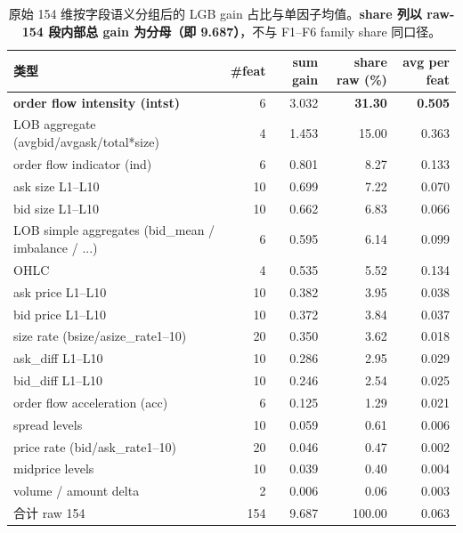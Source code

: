 \documentclass[10.5pt,a4paper]{article}
\begin{document}
\begin{table}[H]
\centering\small
\begin{tabular}{l r r r r}
\toprule
类型 & \#feat & sum gain & share raw (\%) & avg per feat \\
\midrule
\textbf{order flow intensity (intst)}     &  6 & 3.032 & \textbf{31.30} & \textbf{0.505} \\
LOB aggregate (avgbid/avgask/total*size)  &  4 & 1.453 & 15.00 & 0.363 \\
order flow indicator (ind)                &  6 & 0.801 &  8.27 & 0.133 \\
ask size L1–L10                           & 10 & 0.699 &  7.22 & 0.070 \\
bid size L1–L10                           & 10 & 0.662 &  6.83 & 0.066 \\
LOB simple aggregates (bid\_mean / imbalance / ...) &  6 & 0.595 &  6.14 & 0.099 \\
OHLC                                      &  4 & 0.535 &  5.52 & 0.134 \\
ask price L1–L10                          & 10 & 0.382 &  3.95 & 0.038 \\
bid price L1–L10                          & 10 & 0.372 &  3.84 & 0.037 \\
size rate (bsize/asize\_rate1–10)         & 20 & 0.350 &  3.62 & 0.018 \\
ask\_diff L1–L10                          & 10 & 0.286 &  2.95 & 0.029 \\
bid\_diff L1–L10                          & 10 & 0.246 &  2.54 & 0.025 \\
order flow acceleration (acc)             &  6 & 0.125 &  1.29 & 0.021 \\
spread levels                             & 10 & 0.059 &  0.61 & 0.006 \\
price rate (bid/ask\_rate1–10)            & 20 & 0.046 &  0.47 & 0.002 \\
midprice levels                           & 10 & 0.039 &  0.40 & 0.004 \\
volume / amount delta                     &  2 & 0.006 &  0.06 & 0.003 \\
\midrule
合计 raw 154                              & 154 & 9.687 & 100.00 & 0.063 \\
\bottomrule
\end{tabular}
\caption{原始 154 维按字段语义分组后的 LGB gain 占比与单因子均值。\textbf{share 列以 raw-154 段内部总 gain 为分母（即 9.687）}，不与 F1--F6 family share 同口径。}
\label{tab:raw-cat}
\end{table}
\end{document}
